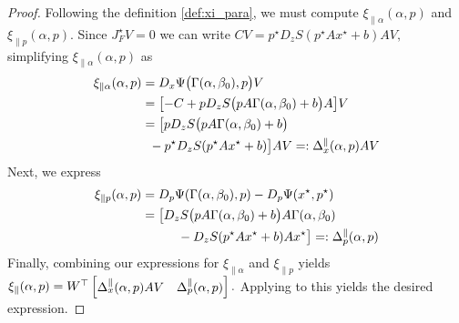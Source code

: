 \documentclass[letterpaper, 10 pt, conference]{ieeeconf}
\begin{document}
\begin{proof}
    Following the definition \eqref{def:xi_para}, we must compute \(\xi_{\parallel\alpha}(\alpha,p)\) and \(\xi_{\parallel p}(\alpha,p)\).
    Since \(J^{\star}_F V = 0\) we can write \(CV = p^{\star}D_{z}S(p^{\star} A x^{\star} + b)AV,\)
    simplifying \(\xi_{\parallel\alpha}(\alpha,p)\) as
    \begin{align*}
        \xi_{\parallel\alpha}(\alpha,p) & = D_{x}\Psi\bigl(\Gamma(\alpha,\beta_0),p\bigr)V                                                        \\
                                        & = \bigl[-C + p D_{z}S\bigl(p A \Gamma(\alpha,\beta_0) + b\bigr)A\bigr]V                                 \\
                                        & = \bigl[p D_{z}S\bigl(p A \Gamma(\alpha,\beta_0) + b\bigr) \notag                                       \\
                                        & \hspace{2mm} - p^{\star}D_{z}S(p^{\star} A x^{\star} + b)\bigr]AV =: \Delta^{\parallel}_{x}(\alpha,p)AV
    \end{align*}
    Next, we express
    \begin{align*}
        \xi_{\parallel p}(\alpha,p) & = D_{p}\Psi(\Gamma(\alpha,\beta_0),p)-D_{p}\Psi(x^{\star},p^{\star})                                    \\
                                    & = \bigl[D_{z}S\bigl(p A \Gamma(\alpha,\beta_0) + b\bigr)A\Gamma(\alpha,\beta_0) \notag                  \\
                                    & \hspace{10mm} - D_{z}S(p^{\star} A x^{\star} + b) A x^{\star}\bigr] =: \Delta^{\parallel}_{p}(\alpha,p)
    \end{align*}
    Finally, combining our expressions for \(\xi_{\parallel\alpha}\) and \(\xi_{\parallel p}\) yields
    \(
    \xi_{\parallel}(\alpha,p) = W^{\top} \begin{bmatrix} \Delta^{\parallel}_{x}(\alpha,p) AV & \Delta^{\parallel}_{p}(\alpha,p) \end{bmatrix}.
    \)
    Applying  to this yields the desired expression.
\end{proof}
\end{document}
